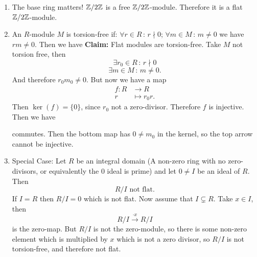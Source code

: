 \documentclass{article}
\begin{document}
\begin{exs}
\begin{enumerate}
\begin{center}
        \end{center}
        The bottom  arrow is injective, since we apply an injective map coordinate by coordinate. We also have that the diagram commutes, so the top arrow is also injective, and therefore $R^{\oplus I}$ is flat.
        \item The base ring matters! $\mathbb{Z} / 2\mathbb{Z}$ is a free $\mathbb{Z} / 2 \mathbb{Z}$-module. Therefore it is a flat $\mathbb{Z}/ 2\mathbb{Z}$-module.
        \item An $R$-module $M$ is torsion-free if: $\forall r \in R \, : \, r \nmid 0$; $\forall m \in M \, : \, m \neq 0$ we have $rm \neq 0 $. Then we have \gap 
        \textbf{Claim: } Flat modules are torsion-free.\gap
        \proof Take $M$ not torsion free, then \[ \exists r_{0} \in R \, : \, r \nmid 0\] \[ \exists m \in M \, : \, m\neq 0.\] And therefore $r_{0}m_{0} \neq 0$. But now we have a map 
        \begin{align*} 
            f: R &\to R\\
            r &\mapsto r_{0}r.
        \end{align*} 
        Then $\ker(f)=\{0\}$, since $r_{0}$ not a zero-divisor. Therefore $f$ is injective. Then we have \begin{center}
        \end{center}
        commutes. Then the bottom map has $0 \neq m_{0}$ in the kernel, so the top arrow cannot be injective.
        \item Special Case: Let $R$ be an integral domain (A non-zero ring with no zero-divisors, or equivalently the $0$ ideal is prime) and let $0 \neq I$ be an ideal of $R$. Then \[ R/I \text{  not flat.}\] \proof If $I=R$ then $R/I = 0$ which is not flat. \gap Now assume that $I \subsetneq R$. Take $x \in I$, then \[ R/I \xrightarrow{\cdot x} R/I\] is the zero-map. But $R/I$ is not the zero-module, so there is some non-zero element which is multiplied by $x$ which is not a zero divisor, so $R/I$ is not torsion-free, and therefore not flat. \endproof
    \end{enumerate}
\end{exs}
\end{document}
